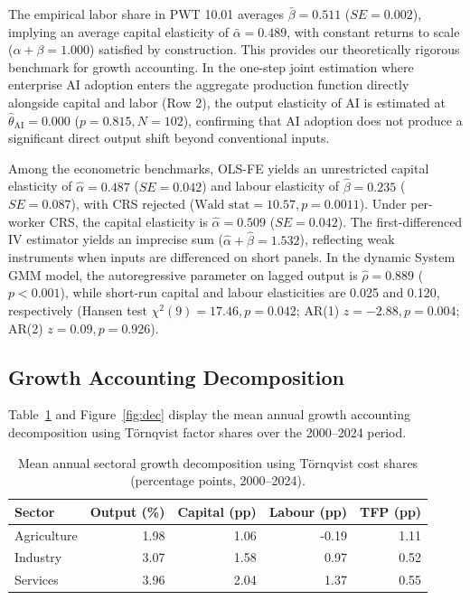\documentclass[11pt,a4paper]{article}
\begin{document}
The empirical labor share in PWT 10.01 averages $\bar{\beta} = 0.511$ ($SE = 0.002$), implying an average capital elasticity of $\bar{\alpha} = 0.489$, with constant returns to scale ($\alpha + \beta = 1.000$) satisfied by construction. This provides our theoretically rigorous benchmark for growth accounting. In the one-step joint estimation where enterprise AI adoption enters the aggregate production function directly alongside capital and labor (Row 2), the output elasticity of AI is estimated at $\hat{\theta}_{\text{AI}} = 0.000$ ($p = 0.815, N = 102$), confirming that AI adoption does not produce a significant direct output shift beyond conventional inputs.

Among the econometric benchmarks, OLS-FE yields an unrestricted capital elasticity of $\hat{\alpha} = 0.487$ ($SE = 0.042$) and labour elasticity of $\hat{\beta} = 0.235$ ($SE = 0.087$), with CRS rejected ($\text{Wald stat} = 10.57, p = 0.0011$). Under per-worker CRS, the capital elasticity is $\hat{\alpha} = 0.509$ ($SE = 0.042$). The first-differenced IV estimator yields an imprecise sum ($\hat{\alpha} + \hat{\beta} = 1.532$), reflecting weak instruments when inputs are differenced on short panels. In the dynamic System GMM model, the autoregressive parameter on lagged output is $\hat{\rho} = 0.889$ ($p < 0.001$), while short-run capital and labour elasticities are 0.025 and 0.120, respectively (Hansen test $\chi^2(9) = 17.46, p = 0.042$; AR(1) $z = -2.88, p = 0.004$; AR(2) $z = 0.09, p = 0.926$).

\subsection{Growth Accounting Decomposition}
Table~\ref{tab:dec} and Figure~\ref{fig:dec} display the mean annual growth accounting decomposition using Törnqvist factor shares over the 2000--2024 period.

\begin{table}[!htbp]
\centering
\small
\begin{tabular}{lrrrr}
\toprule
\textbf{Sector} & \textbf{Output (\%)} & \textbf{Capital (pp)} & \textbf{Labour (pp)} & \textbf{TFP (pp)} \\
\midrule
Agriculture & 1.98 & 1.06 & -0.19 & 1.11 \\
Industry    & 3.07 & 1.58 &  0.97 & 0.52 \\
Services    & 3.96 & 2.04 &  1.37 & 0.55 \\
\bottomrule
\end{tabular}
\caption{Mean annual sectoral growth decomposition using Törnqvist cost shares (percentage points, 2000--2024).}
\label{tab:dec}
\end{table}
\end{document}
